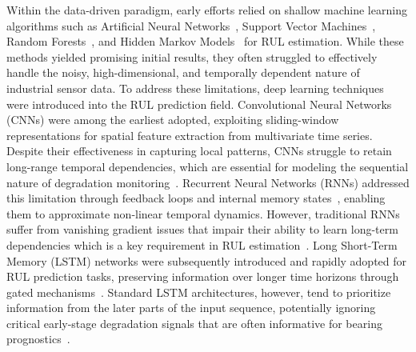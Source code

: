 \documentclass[review]{elsarticle}
\begin{document}
Within the data-driven paradigm, early efforts relied on shallow
machine learning algorithms such as Artificial Neural
Networks~\cite{KHATIR2020102554}, Support Vector
Machines~\cite{TRAN2012320}, Random Forests~\cite{7508982randomforest},
and Hidden Markov Models~\cite{articleHiddenmarkov} for RUL estimation.
While these methods yielded promising initial results, they often
struggled to effectively handle the noisy, high-dimensional, and
temporally dependent nature of industrial sensor data. To address
these limitations, deep learning techniques were introduced into
the RUL prediction field. Convolutional Neural Networks (CNNs) were
among the earliest adopted, exploiting sliding-window representations
for spatial feature extraction from multivariate time series. Despite
their effectiveness in capturing local patterns, CNNs struggle to
retain long-range temporal dependencies, which are essential for
modeling the sequential nature of degradation
monitoring~\cite{shang_capsule_2024, pan2025remaining}. Recurrent
Neural Networks (RNNs) addressed this limitation through feedback
loops and internal memory states~\cite{articleRNNRUL}, enabling them
to approximate non-linear temporal dynamics. However, traditional RNNs
suffer from vanishing gradient issues that impair their ability to
learn long-term dependencies which is a key requirement in RUL
estimation~\cite{heimes_recurrent_2008}. Long Short-Term Memory
(LSTM) networks were subsequently introduced and rapidly adopted
for RUL prediction tasks, preserving information over longer time
horizons through gated mechanisms~\cite{inproceedingsLSTM}. Standard
LSTM architectures, however, tend to prioritize information from the
later parts of the input sequence, potentially ignoring critical
early-stage degradation signals that are often informative for bearing
prognostics~\cite{bai_towards_2024}.\\
\end{document}
